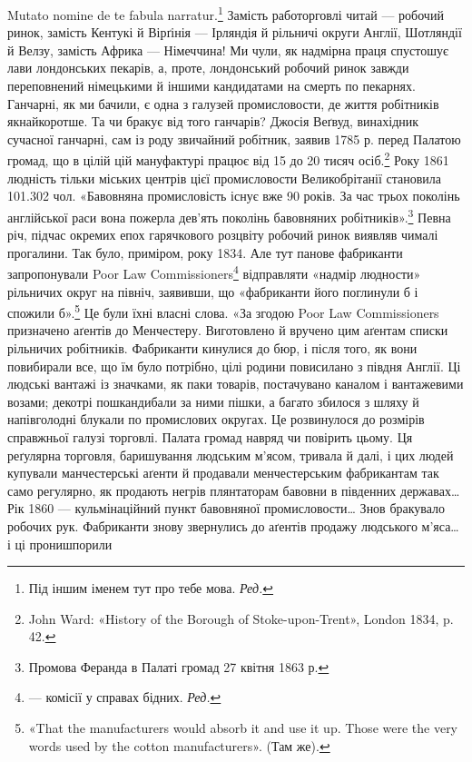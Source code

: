 Mutato nomine de te fabula narratur.\footnote*{
Під іншим іменем тут про тебе мова. \emph{Ред.}
}  Замість работорговлі
читай — робочий ринок, замість Кентукі й Вірґінія — Ірляндія
й рільничі округи Англії, Шотляндії й Велзу, замість Африка —
Німеччина! Ми чули, як надмірна праця спустошує лави лондонських
пекарів, а, проте, лондонський робочий ринок завжди
переповнений німецькими й іншими кандидатами на смерть по
пекарнях. Ганчарні, як ми бачили, є одна з галузей промисловости,
де життя робітників якнайкоротше. Та чи бракує від того ганчарів?
Джосія Веґвуд, винахідник сучасної ганчарні, сам із роду
звичайний робітник, заявив 1785 р. перед Палатою громад,
що в цілій цій мануфактурі працює від 15 до 20 тисяч осіб.\footnote{
John Ward: «History of the Borough of Stoke-upon-Trent», London
1834, p. 42.
}
Року 1861 людність тільки міських центрів цієї промисловости
Великобрітанії становила 101.302 чол. «Бавовняна промисловість
існує вже 90 років. За час трьох поколінь англійської раси
вона пожерла дев’ять поколінь бавовняних робітників».\footnote{
Промова Феранда в Палаті громад 27 квітня 1863 р.
}
Певна річ, підчас окремих епох гарячкового розцвіту робочий
ринок виявляв чималі прогалини. Так було, приміром, року 1834.
Але тут панове фабриканти запропонували Poor Law Commissioners\footnote*{
— комісії у справах бідних. \emph{Ред.}
}
відправляти «надмір людности» рільничих округ на північ,
заявивши, що «фабриканти його поглинули б і спожили б».\footnote{
«That the manufacturers would absorb it and use it up. Those were
the very words used by the cotton manufacturers». (Там же).
}
Це були їхні власні слова. «За згодою Poor Law Commissioners
призначено аґентів до Менчестеру. Виготовлено й вручено цим
аґентам списки рільничих робітників. Фабриканти кинулися до
бюр, і після того, як вони повибирали все, що їм було потрібно,
цілі родини повисилано з півдня Англії. Ці людські вантажі із
значками, як паки товарів, постачувано каналом і вантажевими
возами; декотрі пошкандибали за ними пішки, а багато збилося
з шляху й напівголодні блукали по промислових округах. Це розвинулося
до розмірів справжньої галузі торговлі. Палата громад
навряд чи повірить цьому. Ця реґулярна торговля, баришування
людським м’ясом, тривала й далі, і цих людей купували манчестерські
аґенти й продавали менчестерським фабрикантам так
само регулярно, як продають негрів плянтаторам бавовни в південних
державах\dots{} Рік 1860 — кульмінаційний пункт бавовняної
промисловости\dots{} Знов бракувало робочих рук. Фабриканти
знову звернулись до аґентів продажу людського м’яса\dots{} і ці пронишпорили
